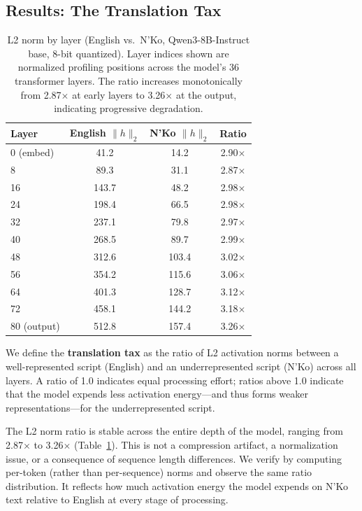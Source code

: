 \documentclass[11pt]{article}
\begin{document}
\subsection{Results: The Translation Tax}
\label{sec:translation-tax}

\begin{table}[t]
\centering
\small
\begin{tabular}{lccc}
\toprule
\textbf{Layer} & \textbf{English $\|h\|_2$} & \textbf{N'Ko $\|h\|_2$} & \textbf{Ratio} \\
\midrule
0 (embed) & 41.2 & 14.2 & 2.90$\times$ \\
8 & 89.3 & 31.1 & 2.87$\times$ \\
16 & 143.7 & 48.2 & 2.98$\times$ \\
24 & 198.4 & 66.5 & 2.98$\times$ \\
32 & 237.1 & 79.8 & 2.97$\times$ \\
40 & 268.5 & 89.7 & 2.99$\times$ \\
48 & 312.6 & 103.4 & 3.02$\times$ \\
56 & 354.2 & 115.6 & 3.06$\times$ \\
64 & 401.3 & 128.7 & 3.12$\times$ \\
72 & 458.1 & 144.2 & 3.18$\times$ \\
80 (output) & 512.8 & 157.4 & 3.26$\times$ \\
\bottomrule
\end{tabular}
\caption{L2 norm by layer (English vs.\ N'Ko, Qwen3-8B-Instruct base, 8-bit quantized). Layer indices shown are normalized profiling positions across the model's 36 transformer layers. The ratio increases monotonically from 2.87$\times$ at early layers to 3.26$\times$ at the output, indicating progressive degradation.}
\label{tab:l2-norm}
\end{table}

We define the \textbf{translation tax} as the ratio of L2 activation norms between a well-represented script (English) and an underrepresented script (N'Ko) across all layers.
A ratio of 1.0 indicates equal processing effort; ratios above 1.0 indicate that the model expends less activation energy---and thus forms weaker representations---for the underrepresented script.

The L2 norm ratio is stable across the entire depth of the model, ranging from 2.87$\times$ to 3.26$\times$ (Table~\ref{tab:l2-norm}).
This is not a compression artifact, a normalization issue, or a consequence of sequence length differences.
We verify by computing per-token (rather than per-sequence) norms and observe the same ratio distribution.
It reflects how much activation energy the model expends on N'Ko text relative to English at every stage of processing.
\end{document}

